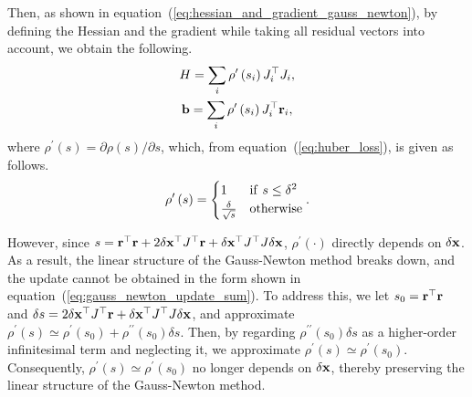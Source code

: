 Then, as shown in equation~(\ref{eq:hessian_and_gradient_gauss_newton}), by defining the Hessian and the gradient while taking all residual vectors into account, we obtain the following.
%
\begin{align}
  \begin{gathered}
    H = \sum_{i} \rho^{\prime} \left( s_{i} \right) J_{i}^{\top} J_{i}, \\
    {\bf b} = \sum_{i} \rho^{\prime} \left( s_{i} \right) J_{i}^{\top} {\bf r}_{i},
  \end{gathered}
  \label{eq:hessian_and_gradient_gauss_newton_huber_loss}
\end{align}
%
where $\rho^{\prime}(s) = \partial \rho(s) / \partial s$, which, from equation~(\ref{eq:huber_loss}), is given as follows.
%
\begin{align}
  \rho^{\prime} \left( s \right)
  =
  \begin{cases}
    1                             & {\rm if} ~ s \leq \delta^{2} \\
    \frac{ \delta }{ \sqrt{ s } } & {\rm otherwise}
  \end{cases}.
  \label{eq:huber_loss_prime}
\end{align}
%

However, since $s = {\bf r}^{\top} {\bf r} + 2 \delta {\bf x}^{\top} J^{\top} {\bf r} + \delta {\bf x}^{\top} J^{\top} J \delta {\bf x}$, $\rho^{\prime}(\cdot)$ directly depends on $\delta {\bf x}$.
As a result, the linear structure of the Gauss-Newton method breaks down, and the update cannot be obtained in the form shown in equation~(\ref{eq:gauss_newton_update_sum}).
To address this, we let $s_{0} = {\bf r}^{\top} {\bf r}$ and $\delta s = 2 \delta {\bf x}^{\top} J^{\top} {\bf r} + \delta {\bf x}^{\top} J^{\top} J \delta {\bf x}$, and approximate $\rho^{\prime}(s) \simeq \rho^{\prime}(s_{0}) + \rho^{\prime \prime}(s_{0}) \delta s$.
Then, by regarding $\rho^{\prime \prime}(s_{0}) \delta s$ as a higher-order infinitesimal term and neglecting it, we approximate $\rho^{\prime}(s) \simeq \rho^{\prime}(s_{0})$.
Consequently, $\rho^{\prime}(s) \simeq \rho^{\prime}(s_{0})$ no longer depends on $\delta {\bf x}$, thereby preserving the linear structure of the Gauss-Newton method.


